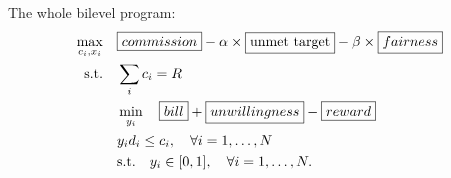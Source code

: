 \documentclass{article}
\begin{document}
The whole bilevel program: 
\begin{subequations}
  \begin{align}
    \max_{c_{i}, x_{i}} \quad & \boxed{commission} - \alpha \times \boxed{\text{unmet target}} - \beta \times \boxed{fairness} \\
    \mathrm{s.t.} \quad & \sum_{i} c_{i} = R \\
    & \min_{y_{i}} \quad \boxed{bill} + \boxed{unwillingness} - \boxed{reward} \\
    & y_{i} d_{i} \le c_{i}, \quad \forall i= 1, \ldots, N \\
    & \mathrm{s.t.} \quad y_{i} \in [0,1], \quad \forall i= 1, \ldots, N.
  \end{align}
\end{subequations}
\end{document}
